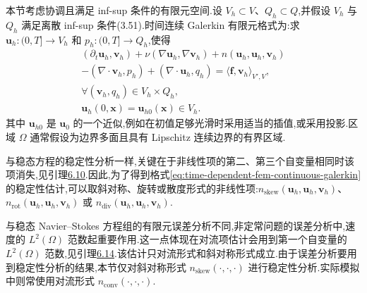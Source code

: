 \begin{note}
\label{note:time-dependent-fem-continuous-galerkin}
本节考虑协调且满足 inf-sup 条件的有限元空间.设 $V_h\subset V$、$Q_h\subset Q$,并假设 $V_h$ 与 $Q_h$ 满足离散 inf-sup 条件(3.51).时间连续 Galerkin 有限元格式为:求
$\bm{u}_h:(0,T]\to V_h$ 和 $p_h:(0,T]\to Q_h$,使得
\begin{equation}\label{eq:time-dependent-fem-continuous-galerkin}
\begin{gathered}
  (\partial_t\bm{u}_h,\bm{v}_h)
    +\nu(\nabla\bm{u}_h,\nabla\bm{v}_h)
    +n(\bm{u}_h,\bm{u}_h,\bm{v}_h)\\
  -(\nabla\cdot\bm{v}_h,p_h)
    +(\nabla\cdot\bm{u}_h,q_h)
    =\langle\bm{f},\bm{v}_h\rangle_{V',V},\\
  \forall(\bm{v}_h,q_h)\in V_h\times Q_h,\\
  \bm{u}_h(0,\bm{x})=\bm{u}_{h0}(\bm{x})\in V_h.
\end{gathered}
\end{equation}
其中 $\bm{u}_{h0}$ 是 $\bm{u}_0$ 的一个近似,例如在初值足够光滑时采用适当的插值,或采用投影.区域 $\Omega$ 通常假设为边界多面且具有 Lipschitz 连续边界的有界区域.

与稳态方程的稳定性分析一样,关键在于非线性项的第二、第三个自变量相同时该项消失,见引理\hyperref[lem:steady-ns-convection-vanishing]{6.10}.因此,为了得到格式\cref{eq:time-dependent-fem-continuous-galerkin} 的稳定性估计,可以取斜对称、旋转或散度形式的非线性项:$n_{\mathrm{skew}}(\bm{u}_h,\bm{u}_h,\bm{v}_h)$、$n_{\mathrm{rot}}(\bm{u}_h,\bm{u}_h,\bm{v}_h)$ 或 $n_{\mathrm{div}}(\bm{u}_h,\bm{u}_h,\bm{v}_h)$.

与稳态 Navier--Stokes 方程组的有限元误差分析不同,非定常问题的误差分析中,速度的 $L^2(\Omega)$ 范数起重要作用.这一点体现在对流项估计会用到第一个自变量的 $L^2(\Omega)$ 范数,见引理\hyperref[lem:steady-ns-convection-estimates-4]{6.14}.该估计只对流形式和斜对称形式成立.由于误差分析要用到稳定性分析的结果,本节仅对斜对称形式 $n_{\mathrm{skew}}(\cdot,\cdot,\cdot)$ 进行稳定性分析.实际模拟中则常使用对流形式 $n_{\mathrm{conv}}(\cdot,\cdot,\cdot)$.
\end{note}
